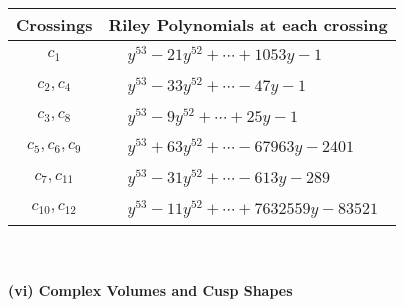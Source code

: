 \documentclass[1p]{elsarticle_modified}
\theoremstyle{definition}
\begin{document}
\begin{tabular}{m{50pt}|m{274pt}}
Crossings & \hspace{64pt}Riley Polynomials at each crossing \\
\hline $$\begin{aligned}c_{1}\end{aligned}$$&$\begin{aligned}
&y^{53}-21 y^{52}+\cdots+1053 y-1
\end{aligned}$\\
\hline $$\begin{aligned}c_{2},c_{4}\end{aligned}$$&$\begin{aligned}
&y^{53}-33 y^{52}+\cdots-47 y-1
\end{aligned}$\\
\hline $$\begin{aligned}c_{3},c_{8}\end{aligned}$$&$\begin{aligned}
&y^{53}-9 y^{52}+\cdots+25 y-1
\end{aligned}$\\
\hline $$\begin{aligned}c_{5},c_{6},c_{9}\end{aligned}$$&$\begin{aligned}
&y^{53}+63 y^{52}+\cdots-67963 y-2401
\end{aligned}$\\
\hline $$\begin{aligned}c_{7},c_{11}\end{aligned}$$&$\begin{aligned}
&y^{53}-31 y^{52}+\cdots-613 y-289
\end{aligned}$\\
\hline $$\begin{aligned}c_{10},c_{12}\end{aligned}$$&$\begin{aligned}
&y^{53}-11 y^{52}+\cdots+7632559 y-83521
\end{aligned}$\\
\hline
\end{tabular}\\~\\
\newpage\flushleft \textbf{(vi) Complex Volumes and Cusp Shapes}
\end{document}
